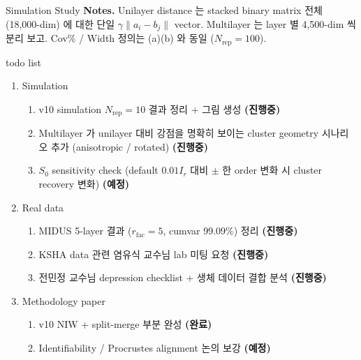\documentclass{beamer}
\begin{document}
\begin{frame}{Simulation Study}
\vspace{2pt}
{\tiny
\textbf{Notes.} Unilayer distance 는 stacked binary matrix 전체 (18{,}000-dim) 에 대한 단일 $\gamma\lVert a_i - b_j\rVert$ vector. Multilayer 는 layer 별 4{,}500-dim 씩 분리 보고. Cov\% / Width 정의는 (a)(b) 와 동일 ($N_{\mathrm{rep}}=100$).
}
\end{frame}

\begin{frame}{todo list}
\begin{enumerate}
    \item Simulation
    \begin{enumerate}
        \item v10 simulation $N_{\mathrm{rep}} = 10$ 결과 정리 + 그림 생성 \textbf{(진행중)}
        \item Multilayer 가 unilayer 대비 강점을 명확히 보이는 cluster geometry 시나리오 추가 (anisotropic / rotated) \textbf{(진행중)}
        \item $S_0$ sensitivity check (default $0.01 I_r$ 대비 $\pm$ 한 order 변화 시 cluster recovery 변화) \textbf{(예정)}
    \end{enumerate}
    \item Real data
    \begin{enumerate}
        \item MIDUS 5-layer 결과 ($r_{\mathrm{fac}} = 5$, cumvar 99.09\%) 정리 \textbf{(진행중)}
        \item KSHA data 관련 염유식 교수님 lab 미팅 요청 \textbf{(진행중)}
        \item 전민정 교수님 depression checklist + 생체 데이터 결합 분석 \textbf{(진행중)}
    \end{enumerate}
    \item Methodology paper
    \begin{enumerate}
        \item v10 NIW + split-merge 부분 완성 \textbf{(완료)}
        \item Identifiability / Procrustes alignment 논의 보강 \textbf{(예정)}
    \end{enumerate}
\end{enumerate}
\end{frame}




\end{document}
